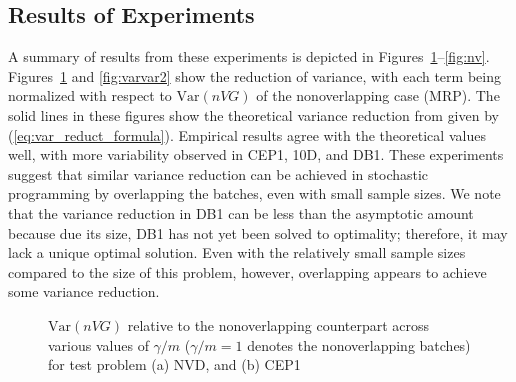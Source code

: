 \documentclass[12pt]{article}
\newcommand{\var}[1]{\mathrm{Var} \left( #1 \right)}
\begin{document}
\subsection{Results of Experiments}
\label{ssec:results}

A summary of results from these experiments is depicted in Figures~\ref{fig:varvar1}--\ref{fig:nv}.
Figures~\ref{fig:varvar1} and \ref{fig:varvar2} show the reduction of variance, with each term being normalized with respect to $\var{nVG}$ of the nonoverlapping case (MRP). 
The solid lines in these figures show the theoretical variance reduction from \citep{Welch1987} given by (\ref{eq:var_reduct_formula}). 
Empirical results agree with the theoretical values well, with more variability observed in CEP1, 10D, and DB1. 
These experiments suggest that similar variance reduction can be achieved in stochastic programming by overlapping the batches, even with small sample sizes.
We note that the variance reduction in DB1 can be less than the asymptotic amount %
because due its size, DB1 has not yet been solved to optimality; therefore, it may lack a unique optimal solution. 
Even with the relatively small sample sizes compared to the size of this problem, however, overlapping appears to achieve some variance reduction. 


\begin{figure}[htb!]
	\centering
	\caption{
		$\var{n VG}$ relative to the nonoverlapping counterpart across various values of $\gamma/m$ ($\gamma/m=1$ denotes the nonoverlapping batches) for test problem
		(a) NVD, and
		(b) CEP1
	}
\label{fig:varvar1}
\end{figure}
\end{document}

